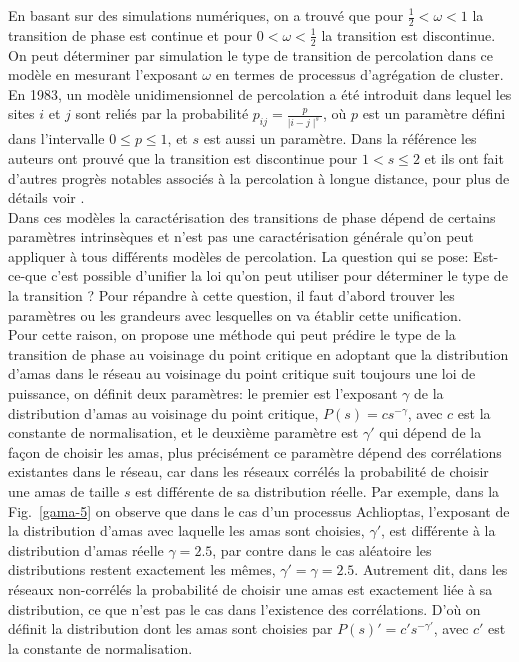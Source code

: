 En basant sur des simulations numériques, on a trouvé que pour $\frac{1}{2}<\omega<1$ la transition de phase est continue et pour $0<\omega<\frac{1}{2}$ la transition est discontinue. On peut déterminer par simulation le type de transition de percolation dans ce modèle en mesurant l'exposant $\omega$ en termes de processus d'agrégation de cluster. En 1983, un modèle unidimensionnel de percolation a été introduit \cite{Schulman1983} dans lequel les sites $i$ et $j$ sont reliés par la probabilité $p_{ij}=\frac{p}{\mid i-j\mid^s}$, où $p$ est un paramètre défini dans l'intervalle $0\leq p\leq1$, et $s$ est aussi un paramètre. Dans la référence \cite{Aizenman-Newman1986} les auteurs ont prouvé que la transition est discontinue pour $1<s\leq2$ et ils ont fait d'autres progrès notables associés à la percolation à longue distance, pour plus de détails voir \cite{Lee-al2016}.\\
Dans ces modèles la caractérisation des transitions de phase dépend de certains paramètres intrinsèques  et n'est pas une caractérisation générale qu'on peut appliquer à tous différents modèles de percolation. La question qui se pose: Est-ce-que c'est possible d'unifier la loi qu'on peut utiliser pour déterminer le type de la transition ? Pour répandre à cette question, il faut d'abord trouver les paramètres ou les grandeurs avec lesquelles on va établir cette unification.\\
Pour cette raison, on propose une méthode qui peut prédire le type de la transition de phase au voisinage du point critique en adoptant que la distribution d'amas dans le réseau au voisinage du point critique suit toujours une loi de puissance, on définit deux paramètres: le premier est l'exposant $\gamma$ de la distribution d'amas au voisinage du point critique, $P(s)=cs^{-\gamma}$, avec $c$ est la constante de normalisation, et le deuxième paramètre est $\gamma'$ qui dépend de la façon de choisir les amas, plus précisément ce paramètre dépend des corrélations existantes dans le réseau, car dans les réseaux corrélés la probabilité de choisir une amas de taille $s$ est différente de sa distribution réelle. Par exemple, dans la Fig.~\ref{gama-5} on observe que dans le cas d'un processus Achlioptas, l'exposant de la distribution d'amas avec laquelle les amas sont choisies, $\gamma'$, est différente à la distribution d'amas réelle $\gamma=2.5$, par contre dans le cas aléatoire les distributions restent exactement les mêmes, $\gamma'=\gamma=2.5$. Autrement dit, dans les réseaux non-corrélés la probabilité de choisir une amas est exactement liée à sa distribution, ce que n'est pas le cas dans l'existence des corrélations. D'où on définit la distribution dont les amas sont choisies par $P(s)'=c's^{-\gamma'}$, avec $c'$ est la constante de normalisation.
